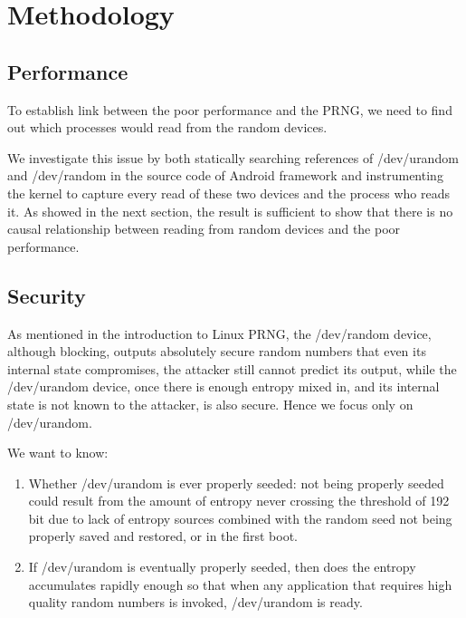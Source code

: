 \section{Methodology}

\subsection{Performance}

To establish link between the poor performance and the PRNG, we need to find out which processes would read from the random devices.

We investigate this issue by both statically searching references of /dev/urandom and /dev/random in the source code of Android framework and instrumenting the kernel to capture every read of these two devices and the process who reads it. As showed in the next section, the result is sufficient to show that there is no causal relationship between reading from random devices and the poor performance.

\subsection{Security}

As mentioned in the introduction to Linux PRNG, the /dev/random device, although blocking, outputs absolutely secure random numbers that even its internal state compromises, the attacker still cannot predict its output, while the /dev/urandom device, once there is enough entropy mixed in, and its internal state is not known to the attacker, is also secure. Hence we focus only on /dev/urandom.

We want to know:

\begin{enumerate}
\item Whether /dev/urandom is ever properly seeded: not being properly seeded could result from the amount of entropy never crossing the threshold of 192 bit due to lack of entropy sources combined with the random seed not being properly saved and restored, or in the first boot.

\item If /dev/urandom is eventually properly seeded, then does the entropy accumulates rapidly enough so that when any application that requires high quality random numbers is invoked, /dev/urandom is ready.

\end{enumerate}

